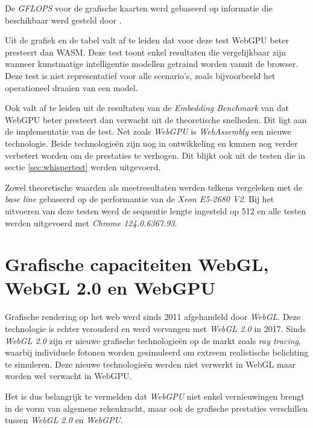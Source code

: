 \bigbreak{}

De \textit{GFLOPS} voor de grafische kaarten werd gebaseerd op informatie die beschikbaar werd gesteld door \textcite{TechPowerUp2017, TechPowerUp2017a}.

\bigbreak{}

Uit de grafiek en de tabel valt af te leiden dat voor deze test WebGPU beter presteert dan WASM. Deze test toont enkel resultaten die vergelijkbaar zijn wanneer kunstmatige intelligentie modellen getraind worden vanuit de browser. Deze test is niet representatief voor alle scenario's, zoals bijvoorbeeld het operationeel draaien van een model.

\bigbreak{}

Ook valt af te leiden uit de resultaten van de \textit{Embedding Benchmark} van \textcite{Lochner2024} dat WebGPU beter presteert dan verwacht uit de theoretische snelheden. Dit ligt aan de implementatie van de test. Net zoals \textit{WebGPU} is \textit{WebAssembly} een nieuwe technologie. Beide technologieën zijn nog in ontwikkeling en kunnen nog verder verbetert worden om de prestaties te verhogen. Dit blijkt ook uit de testen die in sectie \ref{sec:whispertest} werden uitgevoerd.

\bigbreak{}

Zowel theoretische waarden als meetresultaten werden telkens vergeleken met de \textit{base line} gebaseerd op de performantie van de \textit{Xeon E5-2680 V2}. Bij het uitvoeren van deze testen werd de sequentie lengte ingesteld op 512 en alle testen werden uitgevoerd met \emph{Chrome 124.0.6367.93}.

\break{}

\section{Grafische capaciteiten WebGL, WebGL 2.0 en WebGPU}

Grafische rendering op het web werd sinds 2011 afgehandeld door \textit{WebGL}. Deze technologie is echter verouderd en werd vervangen met \textit{WebGL 2.0} in 2017. Sinds \textit{WebGL 2.0} zijn er nieuwe grafische technologieën op de markt zoals \textit{ray tracing}, waarbij individuele fotonen worden gesimuleerd om extreem realistische belichting te simuleren. Deze nieuwe technologieën werden niet verwerkt in WebGL maar worden wel verwacht in WebGPU.

\bigbreak{}

Het is dus belangrijk te vermelden dat \textit{WebGPU} niet enkel vernieuwingen brengt in de vorm van algemene rekenkracht, maar ook de grafische prestaties verschillen tussen \textit{WebGL 2.0} en \textit{WebGPU}. 

